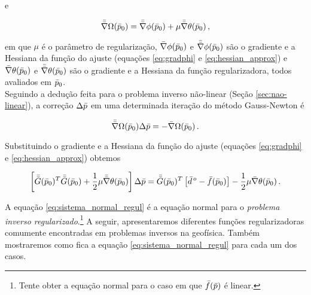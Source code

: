 \noindent e

\begin{equation}
\bar{\bar{\nabla}}\Omega(\bar{p}_0) = \bar{\bar{\nabla}}\phi(\bar{p}_0) +
    \mu\bar{\bar{\nabla}}\theta(\bar{p}_0) \thinspace ,
\label{eq:hessian_objetivo}
\end{equation}

\noindent em que $\mu$ é o parâmetro de regularização,
$\bar{\nabla}\phi(\bar{p}_0)$ e $\bar{\bar{\nabla}}\phi(\bar{p}_0)$
são o gradiente e a Hessiana da função do ajuste (equações \ref{eq:gradphi} e
\ref{eq:hessian_approx}) e
$\bar{\nabla}\theta(\bar{p}_0)$ e $\bar{\bar{\nabla}}\theta(\bar{p}_0)$ são o
gradiente e a Hessiana da função regularizadora, todos avaliados em $\bar{p}_0$.
\\
\indent Seguindo a dedução feita para o problema inverso não-linear (Seção
\ref{sec:nao-linear}), a correção $\Delta\bar{p}$ em uma determinada iteração
do método Gauss-Newton é

\begin{equation}
\bar{\bar{\nabla}}\Omega(\bar{p}_0)\Delta\bar{p} = -\bar{\nabla}\Omega(\bar{p}_0)
    \thinspace .
\label{eq:sistema_normal_objetivo}
\end{equation}

\noindent Substituindo o gradiente e a Hessiana da função do ajuste (equações
\ref{eq:gradphi} e \ref{eq:hessian_approx}) obtemos

\begin{equation}
\left[\bar{\bar{G}}(\bar{p}_0)^T\bar{\bar{G}}(\bar{p}_0) +
      \frac{1}{2}\mu\bar{\bar{\nabla}}\theta(\bar{p}_0)\right]\Delta\bar{p} =
\bar{\bar{G}}(\bar{p}_0)^T \left[\bar{d}^{\thinspace o} - \bar{f}(\bar{p}_0)\right] -
\frac{1}{2}\mu\bar{\nabla}\theta(\bar{p}_0)
    \thinspace .
\label{eq:sistema_normal_regul}
\end{equation}

\indent A equação \ref{eq:sistema_normal_regul} é a equação normal para o
{\it problema inverso regularizado}.\footnote{Tente obter a equação normal para
o caso em que $\bar{f}(\bar{p})$ é linear.}
A seguir, apresentaremos diferentes funções regularizadoras comumente encontradas
em problemas inversos na geofísica.
Também mostraremos como fica a equação \ref{eq:sistema_normal_regul} para cada
um dos casos.





%
